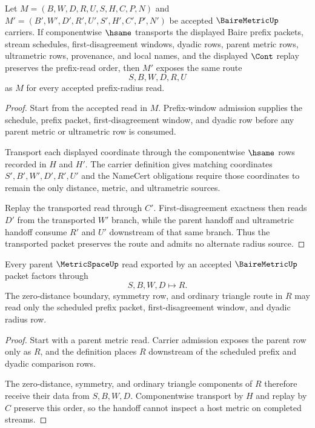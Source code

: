 \begin{theorem}
\label{thm:bairemetric-prefix-radius-transport}
Let $M=(B,W,D,R,U,S,H,C,P,N)$ and $M'=(B',W',D',R',U',S',H',C',P',N')$ be accepted $\BaireMetricUp$ carriers. If componentwise $\hsame$ transports the displayed Baire prefix packets, stream schedules, first-disagreement windows, dyadic rows, parent metric rows, ultrametric rows, provenance, and local names, and the displayed $\Cont$ replay preserves the prefix-read order, then $M'$ exposes the same route
$$
S,B,W,D,R,U
$$
as $M$ for every accepted prefix-radius read.
\end{theorem}
\begin{proof}
Start from the accepted read in $M$. Prefix-window admission supplies the schedule, prefix packet, first-disagreement window, and dyadic row before any parent metric or ultrametric row is consumed.

Transport each displayed coordinate through the componentwise $\hsame$ rows recorded in $H$ and $H'$. The carrier definition gives matching coordinates $S',B',W',D',R',U'$ and the NameCert obligations require those coordinates to remain the only distance, metric, and ultrametric sources.

Replay the transported read through $C'$. First-disagreement exactness then reads $D'$ from the transported $W'$ branch, while the parent handoff and ultrametric handoff consume $R'$ and $U'$ downstream of that same branch. Thus the transported packet preserves the route and admits no alternate radius source.
\end{proof}

\begin{theorem}
\label{thm:bairemetric-parent-metricspace-handoff}
Every parent $\MetricSpaceUp$ read exported by an accepted $\BaireMetricUp$ packet factors through
$$
S,B,W,D \longmapsto R .
$$
The zero-distance boundary, symmetry row, and ordinary triangle route in $R$ may read only the scheduled prefix packet, first-disagreement window, and dyadic radius row.
\end{theorem}
\begin{proof}
Start with a parent metric read. Carrier admission exposes the parent row only as $R$, and the definition places $R$ downstream of the scheduled prefix and dyadic comparison rows.

The zero-distance, symmetry, and ordinary triangle components of $R$ therefore receive their data from $S,B,W,D$. Componentwise transport by $H$ and replay by $C$ preserve this order, so the handoff cannot inspect a host metric on completed streams.
\end{proof}

